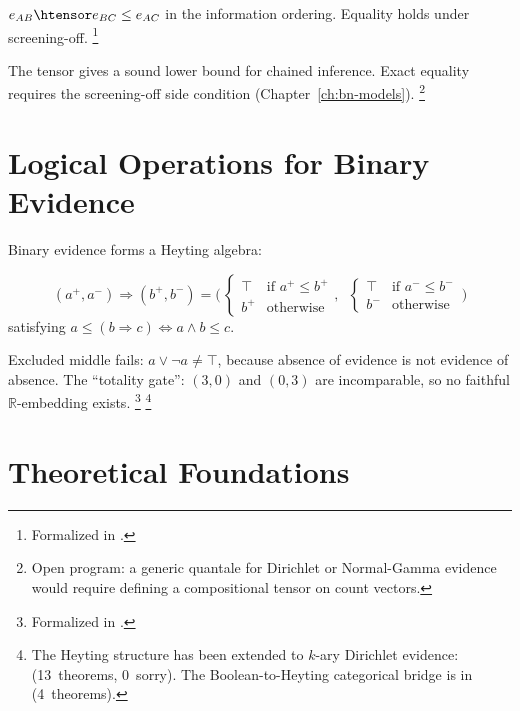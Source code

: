 \documentclass[11pt,openany]{report}
\begin{document}
\begin{theorem}
\label{thm:quantale-trans}
$e_{AB} \htensor e_{BC} \le e_{AC}$ in the information ordering.
Equality holds under screening-off.%
\footnote{Formalized in
.}
\end{theorem}

\noindent
The tensor gives a sound lower bound for chained inference.  Exact
equality requires the screening-off side condition
(Chapter~\ref{ch:bn-models}).%
\footnote{Open program: a generic quantale for Dirichlet or
Normal-Gamma evidence would require defining a compositional tensor
on count vectors.}


\section{Logical Operations for Binary Evidence}
\label{sec:binary-heyting}

Binary evidence forms a Heyting algebra:

\begin{definition}
\[
  (a^+, a^-) \Rightarrow (b^+, b^-) =
  \Big(\,\begin{cases} \top & \text{if } a^+ \le b^+ \\
                        b^+ & \text{otherwise}\end{cases},\;\;
        \begin{cases} \top & \text{if } a^- \le b^- \\
                        b^- & \text{otherwise}\end{cases}\,\Big)
\]
satisfying $a \le (b \Rightarrow c) \iff a \wedge b \le c$.
\end{definition}

\noindent
Excluded middle fails: $a \vee \neg a \ne \top$, because absence of
evidence is not evidence of absence.  The ``totality gate'':
$(3,0)$ and $(0,3)$ are incomparable, so no faithful
$\mathbb{R}$-embedding exists.%
\footnote{Formalized in
.}%
\footnote{The Heyting structure has been extended to $k$-ary
Dirichlet evidence: 
(13~theorems, 0~sorry).  The Boolean-to-Heyting categorical bridge is in
 (4~theorems).}


\section{Theoretical Foundations}
\end{document}
